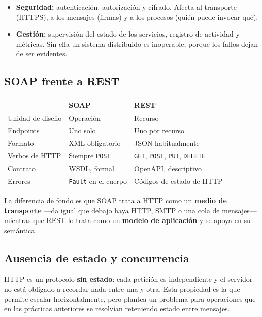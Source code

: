 \documentclass[12pt]{article}
\begin{document}
\begin{itemize}[itemsep=3pt]
    \item \textbf{Seguridad:} autenticación, autorización y cifrado. Afecta al transporte (HTTPS), a los mensajes (firmas) y a los procesos (quién puede invocar qué).
    \item \textbf{Gestión:} supervisión del estado de los servicios, registro de actividad y métricas. Sin ella un sistema distribuido es inoperable, porque los fallos dejan de ser evidentes.
\end{itemize}

\subsection{SOAP frente a REST}

\begin{center}
\begin{tabular}{lll}
\toprule
 & \textbf{SOAP} & \textbf{REST} \\
\midrule
Unidad de diseño   & Operación           & Recurso \\
Endpoints          & Uno solo            & Uno por recurso \\
Formato            & XML obligatorio     & JSON habitualmente \\
Verbos de HTTP     & Siempre \texttt{POST} & \texttt{GET}, \texttt{POST}, \texttt{PUT}, \texttt{DELETE} \\
Contrato           & WSDL, formal        & OpenAPI, descriptivo \\
Errores            & \texttt{Fault} en el cuerpo & Códigos de estado de HTTP \\
\bottomrule
\end{tabular}
\end{center}

La diferencia de fondo es que SOAP trata a HTTP como un \textbf{medio de transporte} —da igual que debajo haya HTTP, SMTP o una cola de mensajes— mientras que REST lo trata como un \textbf{modelo de aplicación} y se apoya en su semántica.

\subsection{Ausencia de estado y concurrencia}

HTTP es un protocolo \textbf{sin estado}: cada petición es independiente y el servidor no está obligado a recordar nada entre una y otra. Esta propiedad es la que permite escalar horizontalmente, pero plantea un problema para operaciones que en las prácticas anteriores se resolvían reteniendo estado entre mensajes.
\end{document}
